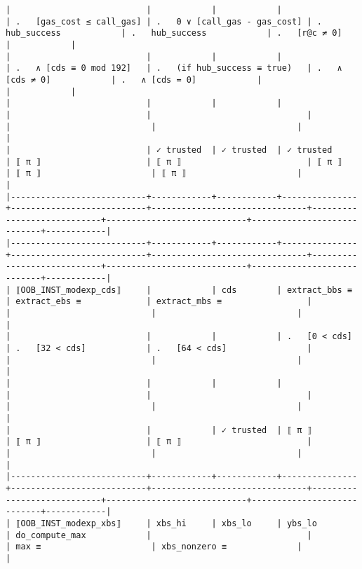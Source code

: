 \documentclass[varwidth=\maxdimen,margin=0.5cm,multi={verbatim}]{standalone}
\begin{document}
\begin{verbatim}
|                           |            |            |               | .   [gas_cost ≤ call_gas] | .   0 ∨ [call_gas - gas_cost] | .   hub_success            | .   hub_success            | .   [r@c ≠ 0]              |            |
|                           |            |            |               | .   ∧ [cds ≡ 0 mod 192]   | .   (if hub_success ≡ true)   | .   ∧ [cds ≠ 0]            | .   ∧ [cds = 0]            |                            |            |
|                           |            |            |               |                           |                               |                            |                            |                            |            |
|                           | ✓ trusted  | ✓ trusted  | ✓ trusted     | ⟦ π ⟧                     | ⟦ π ⟧                         | ⟦ π ⟧                      | ⟦ π ⟧                      | ⟦ π ⟧                      |            |
|---------------------------+------------+------------+---------------+---------------------------+-------------------------------+----------------------------+----------------------------+----------------------------+------------|
|---------------------------+------------+------------+---------------+---------------------------+-------------------------------+----------------------------+----------------------------+----------------------------+------------|
| ⟦OOB_INST_modexp_cds⟧     |            | cds        | extract_bbs ≡ | extract_ebs ≡             | extract_mbs ≡                 |                            |                            |                            |            |
|                           |            |            | .   [0 < cds] | .   [32 < cds]            | .   [64 < cds]                |                            |                            |                            |            |
|                           |            |            |               |                           |                               |                            |                            |                            |            |
|                           |            | ✓ trusted  | ⟦ π ⟧         | ⟦ π ⟧                     | ⟦ π ⟧                         |                            |                            |                            |            |
|---------------------------+------------+------------+---------------+---------------------------+-------------------------------+----------------------------+----------------------------+----------------------------+------------|
| ⟦OOB_INST_modexp_xbs⟧     | xbs_hi     | xbs_lo     | ybs_lo        | do_compute_max            |                               |                            | max ≡                      | xbs_nonzero ≡              |            |

\end{verbatim}
\end{document}
